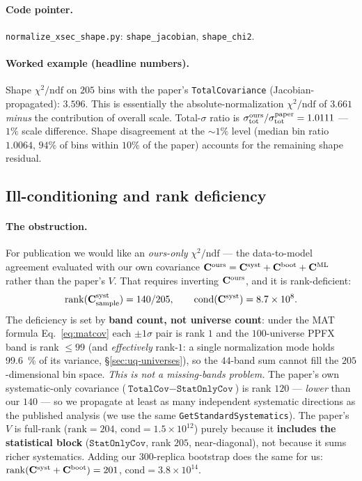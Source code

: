 \paragraph{Code pointer.}
\texttt{normalize\_xsec\_shape.py}: \texttt{shape\_jacobian},
\texttt{shape\_chi2}.

\paragraph{Worked example (headline numbers).}
Shape $\chi^{2}/\mathrm{ndf}$ on $205$ bins with the paper's
\texttt{TotalCovariance} (Jacobian-propagated): $\boxed{3.596}$.
This is essentially the absolute-normalization $\chi^{2}/\mathrm{ndf}$
of $3.661$ \emph{minus} the contribution of overall scale. Total-$\sigma$
ratio is $\sigma_{\text{tot}}^{\text{ours}}/\sigma_{\text{tot}}^{\text{paper}} = 1.0111$ ---
$1\%$ scale difference. Shape disagreement at the $\sim 1\%$ level
(median bin ratio $1.0064$, $94\%$ of bins within $10\%$ of the
paper) accounts for the remaining shape residual.

\subsection{Ill-conditioning and rank deficiency}
\label{sec:rank}

\paragraph{The obstruction.}
For publication we would like an \emph{ours-only} $\chi^{2}/\mathrm{ndf}$
--- the data-to-model agreement evaluated with our own covariance
$\mathbf{C}^{\text{ours}} = \mathbf{C}^{\text{syst}} + \mathbf{C}^{\text{boot}} +
\mathbf{C}^{\text{ML}}$ rather than the paper's $V$. That requires inverting
$\mathbf{C}^{\text{ours}}$, and it is rank-deficient:
\begin{equation}
\mathrm{rank}(\mathbf{C}^{\text{syst}}_{\text{sample}}) = 140 / 205,
\qquad
\mathrm{cond}(\mathbf{C}^{\text{syst}}) = 8.7\times10^{8}.
\end{equation}
The deficiency is set by \textbf{band count, not universe count}:
under the MAT formula Eq.~\eqref{eq:matcov} each $\pm1\sigma$ pair is
rank $1$ and the $100$-universe PPFX band is rank $\le 99$ (and
\emph{effectively} rank-$1$: a single normalization mode holds
\SI{99.6}{\percent} of its variance, \S\ref{sec:uq-universes}), so the
$44$-band sum cannot fill the $205$-dimensional bin space. \emph{This is
not a missing-bands problem.} The paper's own systematic-only covariance
($\texttt{TotalCov}-\texttt{StatOnlyCov}$) is rank $120$ --- \emph{lower}
than our $140$ --- so we propagate at least as many independent systematic
directions as the published analysis (we use the same
\texttt{GetStandardSystematics}). The paper's $V$ is full-rank
($\mathrm{rank}=204$, $\mathrm{cond}=1.5\times10^{12}$) purely because it
\textbf{includes the statistical block} ($\texttt{StatOnlyCov}$, rank
$205$, near-diagonal), not because it sums richer systematics. Adding our
$300$-replica bootstrap does the same for us:
$\mathrm{rank}(\mathbf{C}^{\text{syst}}+\mathbf{C}^{\text{boot}})=201$,
$\mathrm{cond}=3.8\times10^{14}$.

